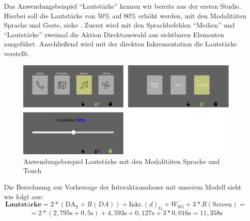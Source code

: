 Das Anwendungsbeispiel "`Lautstärke"' kennen wir bereits aus der ersten Studie. 
Hierbei soll die Lautstärke von 50\% auf 80\% erhöht werden, mit den Modalitäten Sprache und Geste, siehe . 
Zuerst wird mit den Sprachbefehlen "`Medien"' und "`Lautstärke"' zweimal die Aktion Direktauswahl aus sichtbaren Elementen ausgeführt. 
Anschließend wird mit der direkten Inkrementation die Lautstärke verstellt. 
\begin{figure}[ht]
	\centering
		\includegraphics[width=1\textwidth]{img/UseCases_Eval_MedienS.jpg}
	\caption{Anwendungsbeispiel Lautstärke mit den Modalitäten Sprache und Touch}
	\label{fig:UseCasesEvalMedienS}
\end{figure}
Die Berechnung zur Vorhersage der Interaktionsdauer mit unserem Modell sieht wie folgt aus:
\[
\textbf{Lautstärke} = 2*(\text{DA}_\text{S} + R(DA)) + \text{Inkr.} (d)_\text{G} + W_\text{SG} + 3*R(\text{Screen}) =
\]
\[
= 2*( 2,795\text{s} + 0,5\text{s}) + 4,593\text{s} + 0,127\text{s} + 3*0,016\text{s} = 11,358 \text{s}
\]

